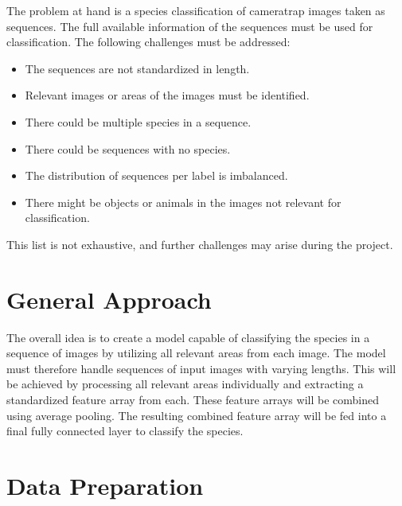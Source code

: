 \documentclass{article}
\begin{document}
The problem at hand is a species classification of cameratrap images taken as sequences. The full available
information of the sequences must be used for classification. The following challenges must be addressed:

\begin{itemize}
  \item The sequences are not standardized in length.
  \item Relevant images or areas of the images must be identified.
  \item There could be multiple species in a sequence.
  \item There could be sequences with no species.
  \item The distribution of sequences per label is imbalanced.
  \item There might be objects or animals in the images not relevant for classification.
\end{itemize}

This list is not exhaustive, and further challenges may arise during the project.

\section*{General Approach} %

The overall idea is to create a model capable of classifying the species in a sequence of images by utilizing all 
relevant areas from each image. The model must therefore handle sequences of input images with varying lengths.
This will be achieved by processing all relevant areas individually and extracting a standardized feature array from 
each. These feature arrays will be combined using average pooling. The resulting combined feature array
will be fed into a final fully connected layer to classify the species.

\section*{Data Preparation} %
\end{document}
